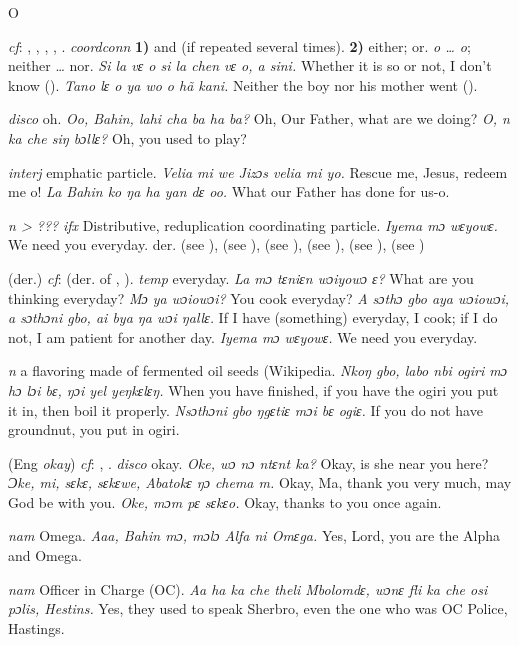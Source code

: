 \begin{letter}{O}

 \textit{cf}: , , , , . \textit{coordconn} \textbf{1)} and (if repeated several times). \textbf{2)} either; or. \textit{o … o}; neither … nor. \textit{Si la vɛ o si la chen vɛ o, a sini.} Whether it is so or not, I don't know (\citealt{Pichl1967}). \textit{Tano lɛ o ya wo o hã kani.} Neither the boy nor his mother went (\citealt{Pichl1967}). 

 \textit{disco} oh. \textit{Oo, Bahin, lahi cha ba ha ba?} Oh, Our Father, what are we doing? \textit{O, n ka che siŋ bɔllɛ?} Oh, you used to play?

 \textit{interj} emphatic particle. \textit{Velia mi we Jizɔs velia mi yo.} Rescue me, Jesus, redeem me o! \textit{La Bahin ko ŋa ha yan dɛ oo.} What our Father has done for us-o.

 \textit{n > ???} \textit{ifx} Distributive, reduplication coordinating particle. \textit{Iyema mɔ wɛyowɛ.} We need you everyday. der.  (see ),  (see ),  (see ),  (see ),  (see ),  (see ) 

 (der.) \textit{cf}:  (der. of , ). \textit{temp} everyday. \textit{La mɔ tɛniɛn wɔiyowɔ ɛ?} What are you thinking everyday? \textit{Mɔ ya wɔiowɔi?} You cook everyday? \textit{A sɔthɔ gbo aya wɔiowɔi, a sɔthɔni gbo, ai bya ŋa wɔi ŋallɛ.} If I have (something) everyday, I cook; if I do not, I am patient for another day. \textit{Iyema mɔ wɛyowɛ.} We need you everyday.

 \textit{n} a flavoring made of fermented oil seeds (Wikipedia. \textit{Nkoŋ gbo, labo nbi ogiri mɔ hɔ lɔi bɛ, ŋɔi yel yeŋkɛlɛŋ.} When you have finished, if you have the ogiri you put it in, then boil it properly. \textit{Nsɔthɔni gbo ŋgɛtiɛ mɔi bɛ ogiɛ.} If you do not have groundnut, you put in ogiri.

 (Eng \textit{okay}) \textit{cf}: , . \textit{disco} okay. \textit{Oke, wɔ nɔ ntɛnt ka?} Okay, is she near you here? \textit{Ɔke, mi, sɛkɛ, sɛkɛwe, Abatokɛ ŋɔ chema m.} Okay, Ma, thank you very much, may God be with you. \textit{Oke, mɔm pɛ sɛkɛo.} Okay, thanks to you once again.

 \textit{nam} Omega. \textit{Aaa, Bahin mɔ, mɔlɔ Alfa ni Omɛga.} Yes, Lord, you are the Alpha and Omega.

 \textit{nam} Officer in Charge (OC). \textit{Aa ha ka che theli Mbolomdɛ, wɔnɛ fli ka che osi pɔlis, Hestins.} Yes, they used to speak Sherbro, even the one who was OC Police, Hastings.


\end{letter}
